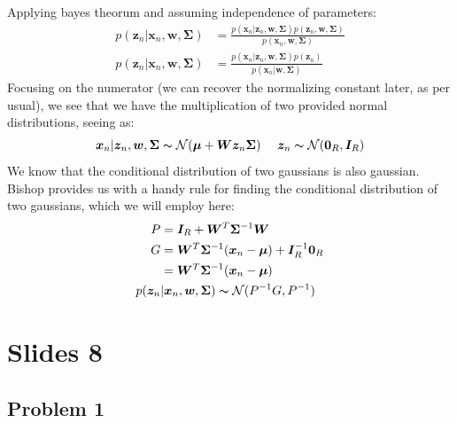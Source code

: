 \documentclass[a4paper,12pt]{article}\usepackage[]{graphicx}\usepackage[]{color}
\begin{document}
Applying bayes theorum and assuming independence of parameters:
%
\begin{align*}
p( \bm{z}_n | \bm{x}_n, \bm{w}, \bm{\Sigma} ) &= \frac{p(\bm{x}_n | \bm{z}_n, \bm{w}, \bm{\Sigma}) p(\bm{z}_n, \bm{w}, \bm{\Sigma})} {p(\bm{x}_n, \bm{w}, \bm{\Sigma})} \\
p( \bm{z}_n | \bm{x}_n, \bm{w}, \bm{\Sigma} ) &= \frac{p(\bm{x}_n | \bm{z}_n, \bm{w}, \bm{\Sigma}) p(\bm{z}_n)} {p(\bm{x}_n | \bm{w}, \bm{\Sigma})}
\end{align*}
%
Focusing on the numerator (we can recover the normalizing constant later, as per usual), we see that we have the multiplication of two provided normal distributions, seeing as:
$$
\bm{x}_n | \bm{z}_n, \bm{w}, \bm{\Sigma} \thicksim \mathcal{N}(\bm{\mu} + \bm{W}\bm{z}_n\bm{\Sigma}) \ \ \ \  \bm{z}_n \thicksim \mathcal{N}(\bm{0}_R, \bm{I}_R)
$$
We know that the conditional distribution of two gaussians is also gaussian. Bishop provides us with a handy rule for finding the conditional distribution of two gaussians, which we will employ here:
\begin{align*}
P &= \bm{I}_R + \bm{W}^T\bm{\Sigma}^{-1}\bm{W} \\
G &= \bm{W}^T\bm{\Sigma}^{-1}(\bm{x}_n - \bm{\mu}) + \bm{I}_R^{-1}\bm{0}_R \\
&= \bm{W}^T\bm{\Sigma}^{-1}(\bm{x}_n - \bm{\mu})\\
p( \bm{z}_n &| \bm{x}_n, \bm{w}, \bm{\Sigma} ) \thicksim \mathcal{N}(P^{-1}G, P^{-1})
\end{align*}
%
\section*{Slides 8}

\subsection*{Problem 1}
\end{document}

